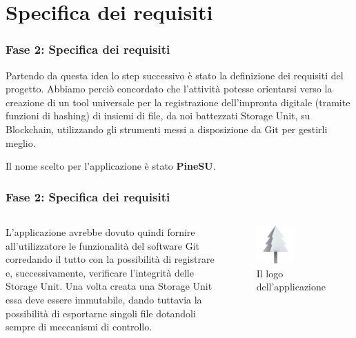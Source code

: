 \documentclass{beamer}
\begin{document}
\section{Specifica dei requisiti}
\begin{frame}
	\frametitle{Fase 2: Specifica dei requisiti}
	Partendo da questa idea lo step successivo è stato la definizione dei requisiti del progetto. Abbiamo perciò concordato che l’attività potesse orientarsi verso la creazione di un tool universale per la registrazione dell’impronta digitale (tramite funzioni di hashing) di insiemi di file, da noi battezzati Storage Unit, su Blockchain, utilizzando gli strumenti messi a disposizione da Git per gestirli meglio.

	Il nome scelto per l'applicazione è stato \textbf{PineSU}.
\end{frame}
\begin{frame}
	\frametitle{Fase 2: Specifica dei requisiti}
	\begin{columns}
		L'applicazione avrebbe dovuto quindi fornire all'utilizzatore le funzionalità del software Git corredando il tutto con la possibilità di registrare e, successivamente, verificare l'integrità delle Storage Unit. Una volta creata una Storage Unit essa deve essere immutabile, dando tuttavia la possibilità di esportarne singoli file dotandoli sempre di meccanismi di controllo.
		\begin{figure}
			\includegraphics[width=0.55\textwidth]{figures/favicon.png}
			\caption{Il logo dell'applicazione}
		\end{figure}
	\end{columns}
\end{frame}
\end{document}
